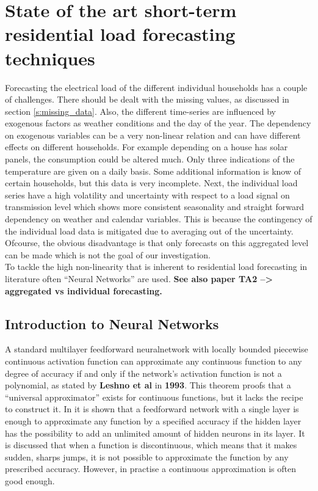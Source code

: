 \chapter{State of the art short-term residential load forecasting techniques}
\label{cha:State of the art short-term residential load forecasting techniques}
Forecasting the electrical load of the different individual households has a couple of challenges. There should be dealt with the missing values, as discussed in section \ref{s:missing_data}. Also, the different time-series are influenced by exogenous factors as weather conditions and the day of the year. The dependency on exogenous variables can be a very non-linear relation and can have different effects on different households. For example depending on a house has solar panels, the consumption could be altered much. Only three indications of the temperature are given on a daily basis. Some additional information is know of certain households, but this data is very incomplete. Next, the individual load series have a high volatility and uncertainty with respect to a load signal on transmission level which shows more consistent seasonality and straight forward dependency on weather and calendar variables. This is because the contingency of the individual load data is mitigated due to averaging out of the uncertainty. Ofcourse, the obvious disadvantage is that only forecasts on this aggregated level can be made which is not the goal of our investigation.\\ To tackle the high non-linearity that is inherent to residential load forecasting in literature often ``Neural Networks'' are used.
\textbf{See also paper TA2 --> aggregated vs individual forecasting.}

\section{Introduction to Neural Networks}\label{s:Introduction to Neural Networks}
A  standard multilayer feedforward neuralnetwork with locally bounded piecewise continuous activation function can approximate any continuous function to any degree of accuracy if and only if the network's activation function is not a polynomial, as stated by \textbf{Leshno et al} in \textbf{1993}. This theorem proofs that a ``universal approximator'' exists for continuous functions, but it lacks the recipe to construct it. In \cite{Nielsen2015} it is shown that a feedforward network with a single layer is enough to approximate any function by a specified accuracy if the hidden layer has the possibility to add an unlimited amount of hidden neurons in its layer. It is discussed that when a function is discontinuous, which means that it makes sudden, sharps jumps, it is not possible to approximate the function by any prescribed accuracy. However, in practise a continuous approximation is often good enough.\\

